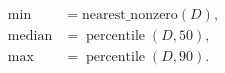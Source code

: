 \begin{align*}
    \text{min} &= \text{nearest\_nonzero}(D),\\
    \text{median} &= \operatorname{percentile}(D, 50),\\
    \text{max} &= \operatorname{percentile}(D, 90).
\end{align*}
